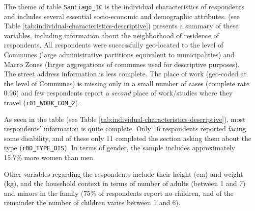 \documentclass[
11pt, %
oneside, %
english, %
singlespacing, %
]{macthesis} %
\begin{document}
The theme of table \texttt{Santiago\_IC} is the individual characteristics of respondents and includes several essential socio-economic and demographic attributes. (see Table \ref{tab:individual-characteristics-descriptive}) presents a summary of these variables, including information about the neighborhood of residence of respondents. All respondents were successfully geo-located to the level of Communes (large administrative partitions equivalent to municipalities) and Macro Zones (larger aggregations of communes used for descriptive purposes). The street address information is less complete. The place of work (geo-coded at the level of Communes) is missing only in a small number of cases (complete rate 0.96) and few respondents report a \emph{second} place of work/studies where they travel (\texttt{r01\_WORK\_COM\_2}).

As seen in the table (see Table \ref{tab:individual-characteristics-descriptive}), most respondents' information is quite complete. Only 16 respondents reported facing some disability, and of these only 11 completed the section asking them about the type (\texttt{r0O\_TYPE\_DIS}). In terms of gender, the sample includes approximately 15.7\% more women than men.

Other variables regarding the respondents include their height (cm) and weight (kg), and the household context in terms of number of adults (between 1 and 7) and minors in the family (75\% of respondents report no children, and of the remainder the number of children varies between 1 and 6).
\end{document}
